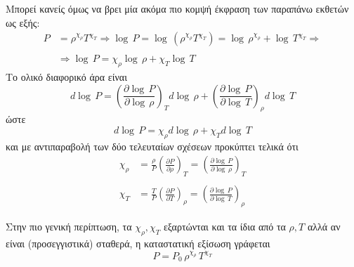 Μπορεί κανείς όμως να βρει μία ακόμα πιο κομψή έκφραση των παραπάνω εκθετών ως εξής:
\begin{align*}
     P &= \rho^{\chi_\rho} T^{\chi_T} \Rightarrow \log \,P = \log \,\left( \rho^{\chi_\rho} T^{\chi_T} \right) = \log \,\rho^{\chi_\rho} + \log \,T^{\chi_T} \Rightarrow \\\\
     &\Rightarrow \log \,P = \chi_\rho \log \,\rho + \chi_T \log \,T
\end{align*}
Το ολικό διαφορικό άρα είναι
\begin{equation*}
    d\log \,P = \left( \frac{\partial \log \,P}{\partial \log \,\rho} \right)_T d \log \,\rho + \left( \frac{\partial \log \,P}{\partial \log \,T} \right)_\rho d \log \,T
\end{equation*}
ώστε
\begin{equation*}
    d \log \,P = \chi_\rho d\log \,\rho + \chi_T d \log \,T
\end{equation*}
και με αντιπαραβολή των δύο τελευταίων σχέσεων προκύπτει τελικά ότι
\begin{align}
    \chi_\rho &= \frac{\rho}{P} \left( \frac{\partial P}{\partial \rho} \right)_T = \left( \frac{\partial \log \,P}{\partial \log \,\rho} \right)_T \label{apx:eq:chi_rho}\\\nonumber\\
    \chi_T &= \frac{T}{P} \left( \frac{\partial P}{\partial T} \right)_\rho = \left( \frac{\partial \log \,P}{\partial \log \,T} \right)_\rho \label{apx:eq:chi_T}
\end{align}

Στην πιο γενική περίπτωση, τα $\chi_\rho, \chi_T$ εξαρτώνται και τα ίδια από τα $\rho, T$ αλλά αν είναι (προσεγγιστικά) σταθερά, η καταστατική εξίσωση γράφεται
\begin{equation}
    \label{apx:eq:eos_chi_rho_chi_T}
    P = P_0 \,\rho^{\chi_\rho} \,T^{\chi_T}
\end{equation}

